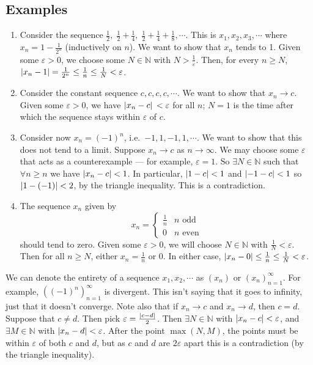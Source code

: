 \subsection{Examples}
\begin{enumerate}
	\item Consider the sequence \(\frac{1}{2},\; \frac{1}{2} + \frac{1}{4},\; \frac{1}{2} + \frac{1}{4} + \frac{1}{8}, \cdots\).
	      This is \(x_1, x_2, x_3, \cdots\) where \(x_n = 1 - \frac{1}{2^n}\) (inductively on \(n\)).
	      We want to show that \(x_n\) tends to 1.
	      Given some \(\varepsilon > 0\), we choose some \(N \in \mathbb N\) with \(N > \frac{1}{\varepsilon}\).
	      Then, for every \(n \geq N\), \(\abs{x_n - 1} = \frac{1}{2^n} \leq \frac{1}{n} \leq \frac{1}{N} < \varepsilon\).
	\item Consider the constant sequence \(c, c, c, c, \cdots\).
	      We want to show that \(x_n \to c\).
	      Given some \(\varepsilon > 0\), we have \(\abs*{x_n - c} < \varepsilon\) for all \(n\); \(N=1\) is the time after which the sequence stays within \(\varepsilon\) of \(c\).
	\item Consider now \(x_n = (-1)^n\), i.e.\ \(-1, 1, -1, 1, \cdots\).
	      We want to show that this does not tend to a limit.
	      Suppose \(x_n \to c\) as \(n \to \infty\).
	      We may choose some \(\varepsilon\) that acts as a counterexample --- for example, \(\varepsilon = 1\).
	      So \(\exists N \in \mathbb N\) such that \(\forall n \geq n\) we have \(\abs{x_n - c} < 1\).
	      In particular, \(\abs{1 - c} < 1\) and \(\abs{-1 - c} < 1\) so \(\abs{1 - (-1)} < 2\), by the triangle inequality.
	      This is a contradiction.
	\item The sequence \(x_n\) given by
	      \[
		      x_n = \begin{cases}
			      \frac{1}{n} & n \text{ odd}  \\
			      0           & n \text{ even}
		      \end{cases}
	      \]
	      should tend to zero.
	      Given some \(\varepsilon > 0\), we will choose \(N \in \mathbb N\) with \(\frac{1}{N} < \varepsilon\).
	      Then for all \(n \geq N\), either \(x_n = \frac{1}{n}\) or 0.
	      In either case, \(\abs{x_n - 0} \leq \frac{1}{n} \leq \frac{1}{N} < \varepsilon\).
\end{enumerate}
We can denote the entirety of a sequence \(x_1, x_2, \cdots\) as \((x_n)\) or \((x_n)_{n=1}^\infty\).
For example, \(\left( (-1)^n \right)_{n=1}^{\infty}\) is divergent.
This isn't saying that it goes to infinity, just that it doesn't converge.
Note also that if \(x_n \to c\) and \(x_n \to d\), then \(c=d\).
Suppose that \(c \neq d\).
Then pick \(\varepsilon = \frac{\abs{c-d}}{2}\).
Then \(\exists N \in \mathbb N\) with \(\abs{x_n - c} < \varepsilon\), and \(\exists M \in \mathbb N\) with \(\abs{x_n - d} < \varepsilon\).
After the point \(\max(N, M)\), the points must be within \(\varepsilon\) of both \(c\) and \(d\), but as \(c\) and \(d\) are \(2\varepsilon\) apart this is a contradiction (by the triangle inequality).


